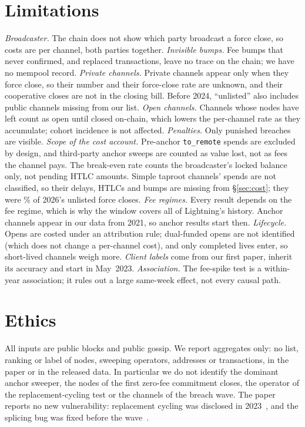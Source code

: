 \section{Limitations}
\label{sec:limitations}
\emph{Broadcaster.} The chain does not show which party broadcast a force close, so costs are per channel, both
parties together.
\emph{Invisible bumps.} Fee bumps that never confirmed, and replaced transactions, leave no trace on the chain; we
have no mempool record.
\emph{Private channels.} Private channels appear only when they force close, so their number and their force-close
rate are unknown, and their cooperative closes are not in the closing bill. Before 2024, ``unlisted'' also includes
public channels missing from our list.
\emph{Open channels.} Channels whose nodes have left count as open until closed on-chain, which lowers the
per-channel rate as they accumulate; cohort incidence is not affected.
\emph{Penalties.} Only punished breaches are visible.
\emph{Scope of the cost account.} Pre-anchor \texttt{to\_remote} spends are excluded by design, and third-party
anchor sweeps are counted as value lost, not as fees the channel pays. The break-even rate counts the broadcaster's
locked balance only, not pending HTLC amounts. Simple taproot channels' spends are not
classified, so their delays, HTLCs and bumps are missing from \S\ref{sec:cost}; they were \UnlTaprootPctTwentySix\% of
2026's unlisted force closes.
\emph{Fee regimes.} Every result depends on the fee regime, which is why the window covers all of Lightning's history.
Anchor channels appear in our data from 2021, so anchor results start then.
\emph{Lifecycle.} Opens are costed under an attribution rule; dual-funded opens are not identified (which does not
change a per-channel cost), and only completed lives enter, so short-lived channels weigh more.
\emph{Client labels} come from our first paper, inherit its accuracy and start in May~2023.
\emph{Association.} The fee-spike test is a within-year association; it rules out a large same-week effect, not every
causal path.

\section{Ethics}
\label{sec:ethics}
All inputs are public blocks and public gossip. We report aggregates only: no list, ranking or label of nodes, sweeping
operators, addresses or transactions, in the paper or in the released data. In particular we do not identify the
dominant anchor sweeper, the nodes of the first zero-fee commitment closes, the operator of the replacement-cycling
test or the channels of the breach wave.
The paper reports no new vulnerability: replacement cycling was disclosed in 2023~\cite{riard2023replacement}, and the
splicing bug was fixed before the wave~\cite{cln26068}.

